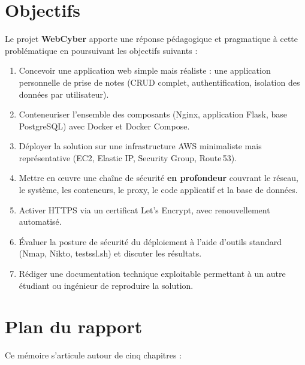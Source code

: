 \section*{Objectifs}

Le projet \textbf{WebCyber} apporte une réponse pédagogique et
pragmatique à cette problématique en poursuivant les objectifs
suivants :

\begin{enumerate}
  \item Concevoir une application web simple mais réaliste : une
        application personnelle de prise de notes (CRUD complet,
        authentification, isolation des données par utilisateur).
  \item Conteneuriser l'ensemble des composants (Nginx, application
        Flask, base PostgreSQL) avec Docker et Docker Compose.
  \item Déployer la solution sur une infrastructure AWS minimaliste
        mais représentative (EC2, Elastic IP, Security Group, Route\,53).
  \item Mettre en œuvre une chaîne de sécurité \textbf{en profondeur}
        couvrant le réseau, le système, les conteneurs, le proxy, le
        code applicatif et la base de données.
  \item Activer HTTPS via un certificat Let's Encrypt, avec
        renouvellement automatisé.
  \item Évaluer la posture de sécurité du déploiement à l'aide
        d'outils standard (Nmap, Nikto, testssl.sh) et discuter les
        résultats.
  \item Rédiger une documentation technique exploitable permettant à
        un autre étudiant ou ingénieur de reproduire la solution.
\end{enumerate}

\section*{Plan du rapport}

Ce mémoire s'articule autour de cinq chapitres :

